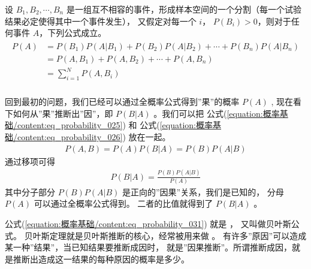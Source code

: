 \documentclass[letterpaper,10pt,english]{sphinxmanual}
\begin{document}
\begin{sphinxShadowBox}

设 \(B_1,B_2,\cdots,B_n\) 是一组互不相容的事件，形成样本空间的一个分割（每一个试验结果必定使得其中一个事件发生），
又假定对每一个 \(i\)， \(P(B_i)>0\)，则对于任何事件 \(A\)，下列公式成立。
\begin{align}\label{equation:概率基础/content:概率基础/content:20}\!\begin{aligned}
P(A) &= P(B_1)P(A|B_1)+ P(B_2)P(A|B_2) + \cdots +P(B_n)P(A|B_n)\\
&=  P(A,B_1) + P(A,B_2) + \cdots+P(A,B_n)\\
&= \sum_{i=1}^N P(A,B_i)\\
\end{aligned}\end{align}\end{sphinxShadowBox}

回到最初的问题，我们已经可以通过全概率公式得到”果”的概率 \(P(A)\) ,
现在看下如何从”果”推断出”因”，即 \(P(B|A)\)
。我们可以把 公式(\ref{equation:概率基础/content:eq_probability_025}) 和 公式(\ref{equation:概率基础/content:eq_probability_026})
放在一起。
\begin{equation}\label{equation:概率基础/content:eq_probability_030}
\begin{split}P(A,B) = P(A)P(B|A) = P(B)P(A|B)\end{split}
\end{equation}
通过移项可得
\begin{equation}\label{equation:概率基础/content:eq_probability_031}
\begin{split}P(B|A) = \frac{P(B)P(A|B)}{P(A)}\end{split}
\end{equation}
其中分子部分 \(P(B)P(A|B)\) 是正向的”因果”关系，我们是已知的，
分母 \(P(A)\) 可以通过全概率公式得到。
二者的比值就得到了 \(P(B|A)\) 。

公式(\ref{equation:概率基础/content:eq_probability_031}) 就是 ，
又叫做贝叶斯公式。
贝叶斯定理就是贝叶斯推断的核心，经常被用来做 。
有许多”原因”可以造成某一种”结果”，当已知结果要推断成因时，
就是”因果推断”。所谓推断成因，就是推断出造成这一结果的每种原因的概率是多少。
\end{document}
